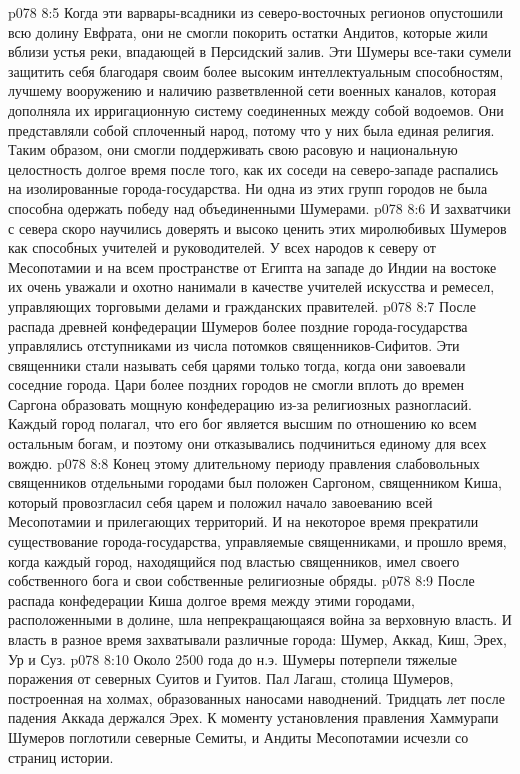 \vs p078 8:5 Когда эти варвары\hyp{}всадники из северо\hyp{}восточных регионов опустошили всю долину Евфрата, они не смогли покорить остатки Андитов, которые жили вблизи устья реки, впадающей в Персидский залив. Эти Шумеры все\hyp{}таки сумели защитить себя благодаря своим более высоким интеллектуальным способностям, лучшему вооружению и наличию разветвленной сети военных каналов, которая дополняла их ирригационную систему соединенных между собой водоемов. Они представляли собой сплоченный народ, потому что у них была единая религия. Таким образом, они смогли поддерживать свою расовую и национальную целостность долгое время после того, как их соседи на северо\hyp{}западе распались на изолированные города\hyp{}государства. Ни одна из этих групп городов не была способна одержать победу над объединенными Шумерами.
\vs p078 8:6 И захватчики с севера скоро научились доверять и высоко ценить этих миролюбивых Шумеров как способных учителей и руководителей. У всех народов к северу от Месопотамии и на всем пространстве от Египта на западе до Индии на востоке их очень уважали и охотно нанимали в качестве учителей искусства и ремесел, управляющих торговыми делами и гражданских правителей.
\vs p078 8:7 После распада древней конфедерации Шумеров более поздние города\hyp{}государства управлялись отступниками из числа потомков священников\hyp{}Сифитов. Эти священники стали называть себя царями только тогда, когда они завоевали соседние города. Цари более поздних городов не смогли вплоть до времен Саргона образовать мощную конфедерацию из\hyp{}за религиозных разногласий. Каждый город полагал, что его бог является высшим по отношению ко всем остальным богам, и поэтому они отказывались подчиниться единому для всех вождю.
\vs p078 8:8 Конец этому длительному периоду правления слабовольных священников отдельными городами был положен Саргоном, священником Киша, который провозгласил себя царем и положил начало завоеванию всей Месопотамии и прилегающих территорий. И на некоторое время прекратили существование города\hyp{}государства, управляемые священниками, и прошло время, когда каждый город, находящийся под властью священников, имел своего собственного бога и свои собственные религиозные обряды.
\vs p078 8:9 После распада конфедерации Киша долгое время между этими городами, расположенными в долине, шла непрекращающаяся война за верховную власть. И власть в разное время захватывали различные города: Шумер, Аккад, Киш, Эрех, Ур и Суз.
\vs p078 8:10 Около 2500 года до н.э. Шумеры потерпели тяжелые поражения от северных Суитов и Гуитов. Пал Лагаш, столица Шумеров, построенная на холмах, образованных наносами наводнений. Тридцать лет после падения Аккада держался Эрех. К моменту установления правления Хаммурапи Шумеров поглотили северные Семиты, и Андиты Месопотамии исчезли со страниц истории.
